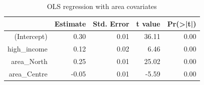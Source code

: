 \begin{table}[H]
\centering
\begin{tabular}{rrrrr}
  \hline
 & Estimate & Std. Error & t value & Pr(>|t|) \\ 
  \hline
(Intercept) & 0.30 & 0.01 & 36.11 & 0.00 \\ 
  high\_income & 0.12 & 0.02 & 6.46 & 0.00 \\ 
  area\_North & 0.25 & 0.01 & 25.02 & 0.00 \\ 
  area\_Centre & -0.05 & 0.01 & -5.59 & 0.00 \\ 
   \hline
\end{tabular}
\caption{OLS regression with area covariates} 
\label{tab:covariate-regression}
\end{table}
